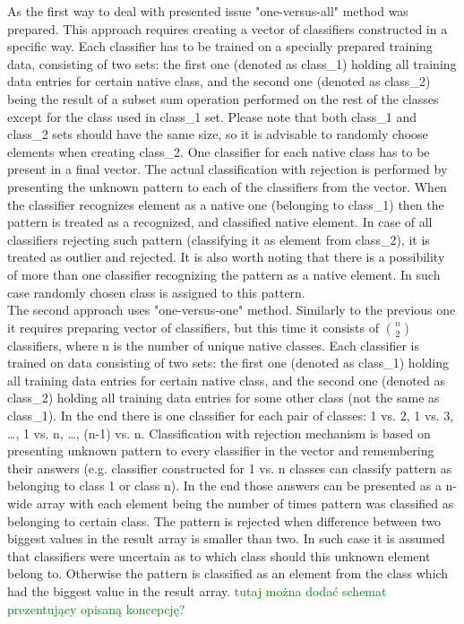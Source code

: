 \documentclass{llncs}
\begin{document}
As the first way to deal with presented issue "one-versus-all" method was prepared. This approach requires creating a vector of classifiers constructed in a specific way. Each classifier has to be trained on a specially prepared training data, consisting of two sets: the first one (denoted as class\_1) holding all training data entries for certain native class, and the second one (denoted as class\_2) being the result of a subset sum operation performed on the rest of the classes except for the class used in class\_1 set. Please note that both class\_1 and class\_2 sets should have the same size, so it is advisable to randomly choose elements when creating class\_2. One classifier for each native class has to be present in a final vector. The actual classification with rejection is performed by presenting the unknown pattern to each of the classifiers from the vector. When the classifier recognizes element as a native one (belonging to class\_1) then the pattern is treated as a recognized, and classified native element. In case of all classifiers rejecting such pattern (classifying it as element from class\_2), it is treated as outlier and rejected. It is also worth noting that there is a possibility of more than one classifier recognizing the pattern as a native element. In such case randomly chosen class is assigned to this pattern. \\

The second approach uses "one-versus-one" method. Similarly to the previous one it requires preparing vector of classifiers, but this time it consists of ${n}\choose{2}$ classifiers, where n is the number of unique native classes. Each classifier is trained on data consisting of two sets: the first one (denoted as class\_1) holding all training data entries for certain native class, and the second one (denoted as class\_2) holding all training data entries for some other class (not the same as class\_1). In the end there is one classifier for each pair of classes: 1 vs. 2, 1 vs. 3, \dots, 1 vs. n, \dots, (n-1) vs. n. Classification with rejection mechanism is based on presenting unknown pattern to every classifier in the vector and remembering their answers (e.g. classifier constructed for 1 vs. n classes can classify pattern as belonging to class 1 or class n). In the end those answers can be presented as a n-wide array with each element being the number of times pattern was classified as belonging to certain class. The pattern is rejected when difference between two biggest values in the result array is smaller than two. In such case it is assumed that classifiers were uncertain as to which class should this unknown element belong to. Otherwise the pattern is classified as an element from the class which had the biggest value in the result array. \textcolor{green}{tutaj można dodać schemat prezentujący opisaną koncepcję?} \\\\
\end{document}
